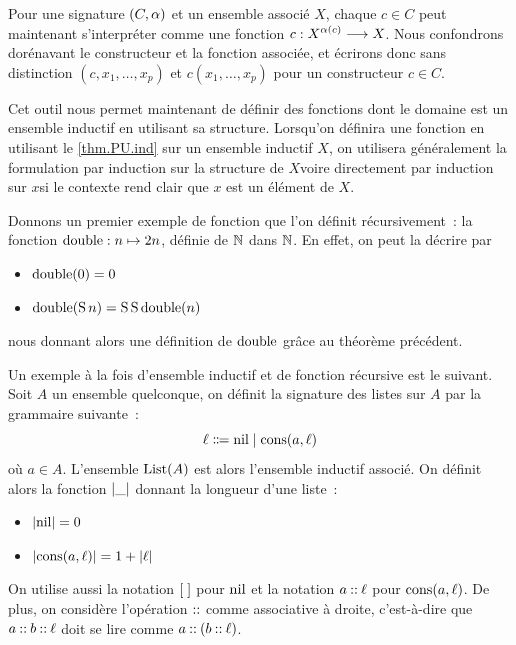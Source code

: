 \begin{remark}
  Pour une signature $(C,\alpha)$ et un ensemble associé $X$, chaque $c\in C$
  peut maintenant s'interpréter comme une fonction
  $c : \displaystyle X^{\alpha(c)} \longrightarrow X$. Nous
  confondrons dorénavant le constructeur et la fonction associée, et écrirons
  donc sans distinction $(c,x_1,\ldots,x_p)$ et $c(x_1,\ldots,x_p)$ pour un
  constructeur $c \in C$.
\end{remark}

Cet outil nous permet maintenant de définir des fonctions dont le domaine est
un ensemble inductif en utilisant sa structure. Lorsqu'on définira une fonction
en utilisant le \cref{thm.PU.ind} sur un ensemble inductif $X$, on utilisera
généralement la formulation \og par induction sur la structure de $X$\fg voire
directement \og par induction sur $x$\fg si le contexte rend clair que $x$ est
un élément de $X$.

\begin{example}%
  Donnons un premier exemple de fonction que l'on définit récursivement~: la
  fonction $\operatorname{double} : n\mapsto 2n$, définie de $\mathbb N$ dans $\mathbb N$. En effet, on
  peut la décrire par
  \begin{itemize}
  \item $\operatorname{double}(0) = 0$
  \item $\operatorname{double}(\operatorname{S} n) = \operatorname{S} \operatorname{S} \operatorname{double}(n)$
  \end{itemize}
  nous donnant alors une définition de $\operatorname{double}$ grâce au théorème précédent.
\end{example}

\begin{example}
  Un exemple à la fois d'ensemble inductif et de fonction récursive est le
  suivant. Soit $A$ un ensemble quelconque, on définit la signature des listes
  sur $A$ par la grammaire suivante~:
  \[\varlist \inddefeq \nil\mid \cons(a,\varlist)\]
  où $a\in A$. L'ensemble $\operatorname{List}(A)$ est alors l'ensemble inductif
  associé. On définit alors la fonction $\left\vert\mathord{\_}\right\vert$ donnant la longueur
  d'une
  liste~:
  \begin{itemize}
  \item $\left\vert\operatorname{nil}\right\vert = 0$
  \item $\left\vert\operatorname{cons}(a,\ell)\right\vert = 1 + |\ell|$
  \end{itemize}
\end{example}

\begin{notation}
  On utilise aussi
  la notation $[\;]$ pour $\operatorname{nil}$ et
  la notation $a \mathbin{::} \ell$ pour $\operatorname{cons}(a,\ell)$. De plus,
  on considère l'opération $\mathord{\mathbin{::}}$ comme associative à droite,
  c'est-à-dire que $a\mathbin{::} b \mathbin{::} \ell$ doit se lire comme
  $a\mathbin{::}(b\mathbin{::} \ell)$.
\end{notation}

